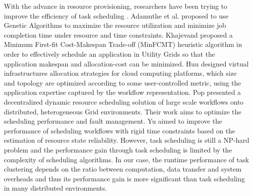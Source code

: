 With the advance in resource provisioning, researchers have been trying to improve the efficiency of task scheduling \cite{Khajevand2012, Adamuthe2011, Huu2010, Pop2008, Yu2008}. Adamuthe et al. \cite{Adamuthe2011} proposed to use Genetic Algorithms to maximize the resource utilization and minimize job completion time under resource and time constraints. Khajevand \cite{Khajevand2012} proposed a Minimum First-fit Cost-Makespan Trade-off (MinFCMT) heuristic algorithm in order to effectively schedule an application in Utility Grids so that the application makespan and allocation-cost can be minimized. 
Huu \cite{Huu2010} designed virtual infrastructures allocation strategies for cloud computing platforms, which size and topology are optimized according to some user-controlled metric, using the application expertise captured by the workflow representation. Pop \cite{Pop2008} presented a decentralized dynamic resource scheduling solution of large scale workflows onto distributed, heterogeneous Grid environments. Their work aims to optimize the scheduling performance and fault management. Yu \cite{Yu2008} aimed to improve the performance of scheduling workflows with rigid time constraints based on the estimation of resource state reliability. 
However, task scheduling is still a NP-hard problem and the performance gain through task scheduling is limited by the complexity of scheduling algorithms. In our case, the runtime performance of task clustering depends on the ratio between computation, data transfer and system overheads and thus its performance gain is more significant than task scheduling in many distributed environments. 



